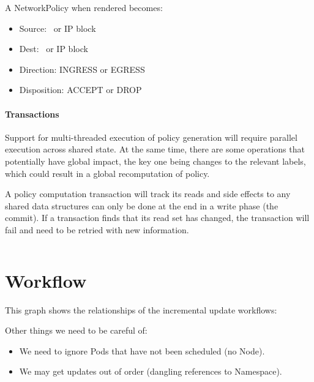 \documentclass[11pt]{article}
\begin{document}
A NetworkPolicy when rendered becomes:

\begin{itemize}
    \item Source: \podeqc\ or IP block
    \item Dest: \podeqc\ or IP block
    \item Direction: INGRESS or EGRESS
    \item Disposition: ACCEPT or DROP
\end{itemize}

\paragraph{Transactions}

Support for multi-threaded execution of policy generation will require parallel
execution across shared state. At the same time, there are some operations that
potentially have global impact, the key one being changes to the relevant labels,
which could result in a global recomputation of policy.

A policy computation transaction will track its reads and side effects to any
shared data structures can only be done at the end in a write phase (the commit).
If a transaction finds that its read set has changed, the transaction will fail
and need to be retried with new information.

\begin{verbatim}

\end{verbatim}

\section{Workflow}

This graph shows the relationships of the incremental update workflows:


Other things we need to be careful of:

\begin{itemize}
    \item We need to ignore Pods that have not been scheduled (no Node).
    \item We may get updates out of order (dangling references to Namespace).
\end{itemize}
\end{document}
